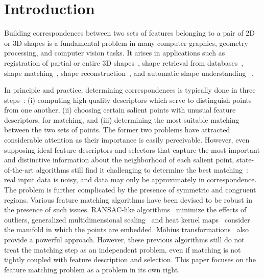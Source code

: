 \section{Introduction}
\label{sec:introduction}

Building correspondences between two sets of features belonging to a pair of 2D or 3D shapes
is a fundamental problem in many computer graphics, geometry processing, and computer vision tasks.
It arises in applications such as
registration of partial or entire 3D shapes~\cite{Besl92,Gelfand05,Aiger08,li08,Chang09,Zeng10,vanKaick11,Chang11},
shape retrieval from databases~\cite{Bronstein11},
shape matching~\cite{Berg05,Brown07,Lorenzo08,Tevs09,Ovsjanikov10,Tevs11,SahilliogluY11,Windheuser11},
shape reconstruction~\cite{Brown07,Pekelny08,Wand09,Chang11},
and automatic shape understanding~\cite{Lipman09,Sun10,Kim11} .

In principle and practice, determining correspondences is typically done in three steps~\cite{Johnson99,Lowe04,Sun09,Bokeloh08,Toler10,Leutenegger11}:
(i) computing high-quality descriptors which serve to distinguish points from one another,
(ii) choosing certain salient points with unusual feature descriptors, for matching,
and (iii) determining the most suitable matching between the two sets of points.
The former two problems have attracted considerable attention as their importance is easily perceivable.
However, even supposing ideal feature descriptors and selectors that capture the most important and distinctive information about the neighborhood of each salient point,
state-of-the-art algorithms  still find it challenging to determine the best matching~\cite{vanKaick11}:  real input data is noisy, and data may only be approximately in correspondence. The problem is further complicated by the presence of symmetric and congruent regions.
Various feature matching algorithms have been devised to be robust in the presence of such issues. RANSAC-like algorithms~\cite{Tevs09,Tevs11}  minimize the effects of outliers,
generalized multidimensional scaling~\cite{Bronstein11} and
heat kernel maps~\cite{Ovsjanikov10}  consider the manifold in which the points are embedded. M{\"o}bius transformations~\cite{Lipman09,Kim11} also provide a powerful approach.
However, these previous algorithms still do not treat the matching step as an independent problem, even if matching is not tightly coupled with feature description and selection.
This paper focuses on the feature matching problem as a problem in its own right.

